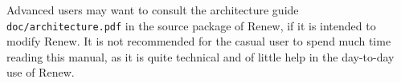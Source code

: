 Advanced users may want to consult the architecture guide
\texttt{doc/architecture.pdf} in the source package of Renew,
if it is intended to modify Renew. It is not recommended for the casual
user to spend much time reading this manual, as it is quite technical
and of little help in the day-to-day use of Renew.





